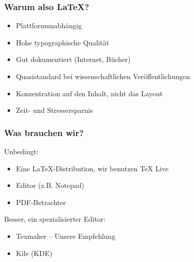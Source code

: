 \begin{frame}
    \frametitle{Warum also \LaTeX?{}}
    \begin{itemize}
        \item Plattformunabhängig
        \item Hohe typographische Qualität
        \item Gut dokumentiert (Internet, Bücher)
        \item Quasistandard bei wissenschaftlichen Veröffentlichungen
        \item Konzentration auf den Inhalt, nicht das Layout
        \item Zeit- und Stressersparnis
    \end{itemize}
\end{frame}

\begin{frame}
    \frametitle{Was brauchen wir?}
    Unbedingt:
    \begin{itemize}
        \item Eine \LaTeX{}-Distribution, wir benutzen TeX Live
        \item Editor (z.B. Notepad)
        \item PDF-Betrachter
    \end{itemize}
    \pause
    \bigskip
    Besser, ein spezialisierter Editor:
    \begin{itemize}
        \item Texmaker -- Unsere Empfehlung
        \item Kile (KDE)
    \end{itemize}
\end{frame}


